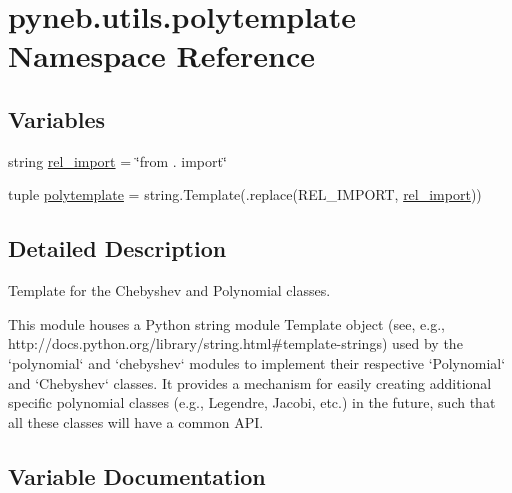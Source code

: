 \hypertarget{namespacepyneb_1_1utils_1_1polytemplate}{}\section{pyneb.\+utils.\+polytemplate Namespace Reference}
\label{namespacepyneb_1_1utils_1_1polytemplate}
\subsection*{Variables}
\begin{DoxyCompactItemize}
\item 
string \hyperlink{namespacepyneb_1_1utils_1_1polytemplate_aa83c10e04dfe538e76bb3ef660edeff9}{rel\+\_\+import} = \char`\"{}from . import\char`\"{}
\item 
tuple \hyperlink{namespacepyneb_1_1utils_1_1polytemplate_a7ee2416855723d9fcee3328ec01ad826}{polytemplate} = string.\+Template(.replace(\textquotesingle{}R\+E\+L\+\_\+\+I\+M\+P\+O\+R\+T\textquotesingle{}, \hyperlink{namespacepyneb_1_1utils_1_1polytemplate_aa83c10e04dfe538e76bb3ef660edeff9}{rel\+\_\+import}))
\end{DoxyCompactItemize}


\subsection{Detailed Description}
\begin{DoxyVerb}Template for the Chebyshev and Polynomial classes.

This module houses a Python string module Template object (see, e.g.,
http://docs.python.org/library/string.html#template-strings) used by
the `polynomial` and `chebyshev` modules to implement their respective
`Polynomial` and `Chebyshev` classes.  It provides a mechanism for easily
creating additional specific polynomial classes (e.g., Legendre, Jacobi,
etc.) in the future, such that all these classes will have a common API.\end{DoxyVerb}
 

\subsection{Variable Documentation}
\hypertarget{namespacepyneb_1_1utils_1_1polytemplate_a7ee2416855723d9fcee3328ec01ad826}{}
